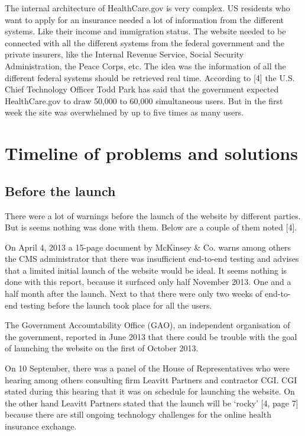 \documentclass[]{article}
\begin{document}
The internal architecture of HealthCare.gov is very complex. US
residents who want to apply for an insurance needed a lot of information
from the different systems. Like their income and immigration status.
The website needed to be connected with all the different systems from
the federal government and the private insurers, like the Internal
Revenue Service, Social Security Administration, the Peace Corps, etc.
The idea was the information of all the different federal systems should
be retrieved real time. According to {[}4{]} the U.S. Chief Technology
Officer Todd Park has said that the government expected HealthCare.gov
to draw 50,000 to 60,000 simultaneous users. But in the first week the
site was overwhelmed by up to five times as many users.

\section{Timeline of problems and
solutions}\label{timeline-of-problems-and-solutions}

\subsection{Before the launch}\label{before-the-launch}

There were a lot of warnings before the launch of the website by
different parties. But is seems nothing was done with them. Below are a
couple of them noted {[}4{]}.

On April 4, 2013 a 15-page document by McKinsey \& Co. warns among
others the CMS administrator that there was insufficient end-to-end
testing and advises that a limited initial launch of the website would
be ideal. It seems nothing is done with this report, because it surfaced
only half November 2013. One and a half month after the launch. Next to
that there were only two weeks of end-to-end testing before the launch
took place for all the users.

The Government Accountability Office (GAO), an independent organisation
of the government, reported in June 2013 that there could be trouble
with the goal of launching the website on the first of October 2013.

On 10 September, there was a panel of the House of Representatives who
were hearing among others consulting firm Leavitt Partners and
contractor CGI. CGI stated during this hearing that it was on schedule
for launching the website. On the other hand Leavitt Partners stated
that the launch will be `rocky' {[}4, page 7{]} because there are still
ongoing technology challenges for the online health insurance exchange.
\end{document}
